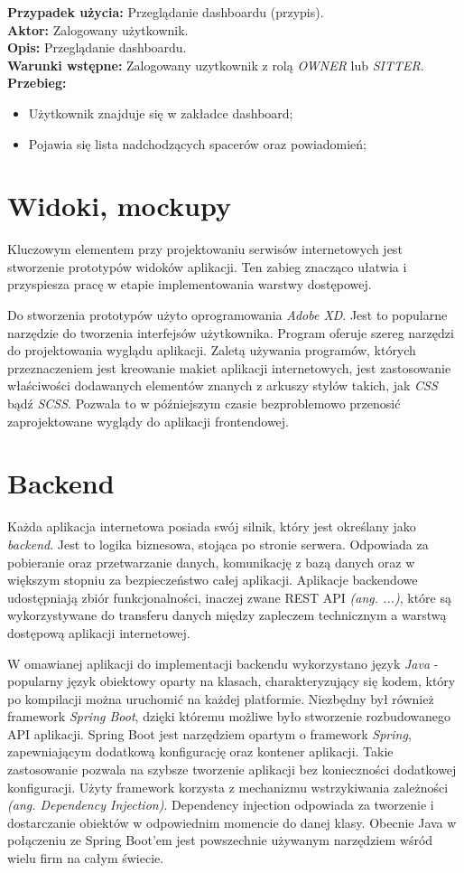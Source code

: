 \noindent
\textbf{Przypadek użycia:} Przeglądanie dashboardu (przypis). \\
\textbf{Aktor:} Zalogowany użytkownik. \\
\textbf{Opis:} Przeglądanie dashboardu. \\
\textbf{Warunki wstępne:} Zalogowany uzytkownik z rolą \textit{OWNER} lub \textit{SITTER}. \\
\textbf{Przebieg:}
\begin{itemize}
    \item Użytkownik znajduje się w zakładce dashboard;
    \item Pojawia się lista nadchodzących spacerów oraz powiadomień;
\end{itemize}

\section{Widoki, mockupy}
Kluczowym elementem przy projektowaniu serwisów internetowych jest stworzenie prototypów widoków aplikacji. Ten zabieg znacząco ułatwia i przyspiesza pracę w etapie implementowania warstwy dostępowej. 

Do stworzenia prototypów użyto oprogramowania \textit{Adobe XD}. Jest to popularne narzędzie do tworzenia interfejsów użytkownika. Program oferuje szereg narzędzi do projektowania wyglądu aplikacji. Zaletą używania programów, których przeznaczeniem jest kreowanie makiet aplikacji internetowych, jest zastosowanie właściwości dodawanych elementów znanych z arkuszy stylów takich, jak \textit{CSS} bądź \textit{SCSS}. Pozwala to w późniejszym czasie bezproblemowo przenosić zaprojektowane wyglądy do aplikacji frontendowej.
\section{Backend}
Każda aplikacja internetowa posiada swój silnik, który jest określany jako \textit{backend}. Jest to logika biznesowa, stojąca po stronie serwera. Odpowiada za pobieranie oraz przetwarzanie danych, komunikację z bazą danych oraz w większym stopniu za bezpieczeństwo całej aplikacji. Aplikacje backendowe udostępniają zbiór funkcjonalności, inaczej zwane REST API \textit{(ang. ...)}, które są wykorzystywane do transferu danych między zapleczem technicznym a warstwą dostępową aplikacji internetowej.

W omawianej aplikacji do implementacji backendu wykorzystano język \textit{Java} - popularny język obiektowy oparty na klasach, charakteryzujący się kodem, który po kompilacji można uruchomić na każdej platformie. Niezbędny był również framework \textit{Spring Boot}, dzięki któremu możliwe było stworzenie rozbudowanego API aplikacji. Spring Boot jest narzędziem opartym o framework \textit{Spring}, zapewniającym dodatkową konfigurację oraz kontener aplikacji. Takie zastosowanie pozwala na szybsze tworzenie aplikacji bez konieczności dodatkowej konfiguracji. Użyty framework korzysta z mechanizmu wstrzykiwania zależności \textit{(ang. Dependency Injection)}. Dependency injection odpowiada za tworzenie i dostarczanie obiektów w odpowiednim momencie do danej klasy. Obecnie Java w połączeniu ze Spring Boot'em jest powszechnie używanym narzędziem wśród wielu firm na całym świecie. 

